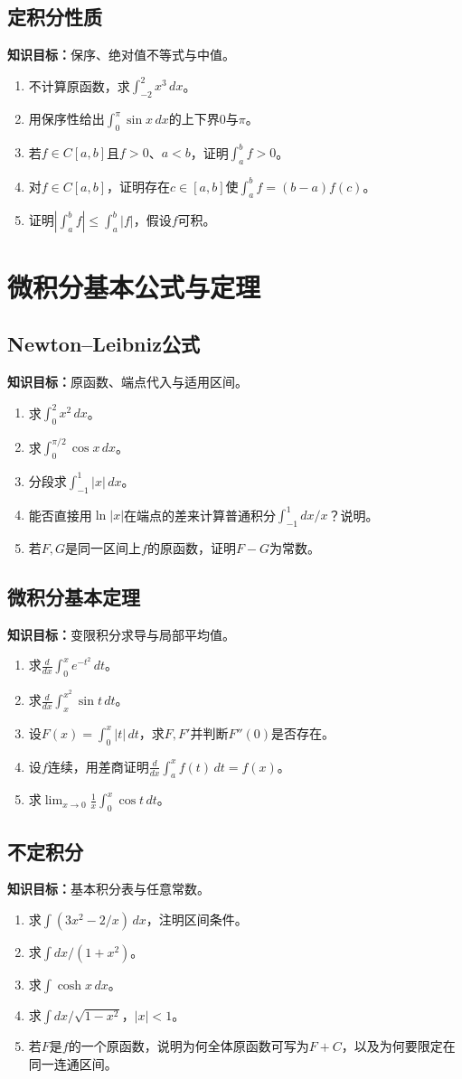 \documentclass[11pt,a4paper,fontset=fandol]{ctexrep}
\newcommand{\goal}[1]{\textbf{知识目标：}#1\par}
\begin{document}
\subsection{定积分性质}
\goal{保序、绝对值不等式与中值。}
\begin{enumerate}
\item 不计算原函数，求$\int_{-2}^2x^3\,dx$。
\item 用保序性给出$\int_0^\pi\sin x\,dx$的上下界$0$与$\pi$。
\item 若$f\in C[a,b]$且$f>0$、$a<b$，证明$\int_a^bf>0$。
\item 对$f\in C[a,b]$，证明存在$c\in[a,b]$使$\int_a^bf=(b-a)f(c)$。
\item 证明$|\int_a^bf|\le\int_a^b|f|$，假设$f$可积。
\end{enumerate}
\section{微积分基本公式与定理}
\subsection{Newton--Leibniz公式}
\goal{原函数、端点代入与适用区间。}
\begin{enumerate}
\item 求$\int_0^2x^2\,dx$。
\item 求$\int_0^{\pi/2}\cos x\,dx$。
\item 分段求$\int_{-1}^1|x|\,dx$。
\item 能否直接用$\ln|x|$在端点的差来计算普通积分$\int_{-1}^1 dx/x$？说明。
\item 若$F,G$是同一区间上$f$的原函数，证明$F-G$为常数。
\end{enumerate}
\subsection{微积分基本定理}
\goal{变限积分求导与局部平均值。}
\begin{enumerate}
\item 求$\frac{d}{dx}\int_0^x e^{-t^2}\,dt$。
\item 求$\frac{d}{dx}\int_x^{x^2}\sin t\,dt$。
\item 设$F(x)=\int_0^x|t|\,dt$，求$F,F'$并判断$F''(0)$是否存在。
\item 设$f$连续，用差商证明$\frac{d}{dx}\int_a^xf(t)\,dt=f(x)$。
\item 求$\lim_{x\to0}\frac1x\int_0^x\cos t\,dt$。
\end{enumerate}
\subsection{不定积分}
\goal{基本积分表与任意常数。}
\begin{enumerate}
\item 求$\int(3x^2-2/x)\,dx$，注明区间条件。
\item 求$\int dx/(1+x^2)$。
\item 求$\int\cosh x\,dx$。
\item 求$\int dx/\sqrt{1-x^2}$，$|x|<1$。
\item 若$F$是$f$的一个原函数，说明为何全体原函数可写为$F+C$，以及为何要限定在同一连通区间。
\end{enumerate}
\end{document}
